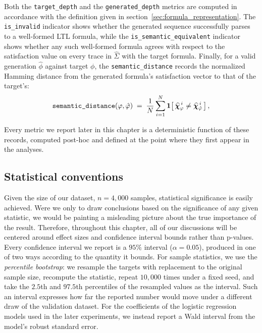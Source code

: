 \documentclass[titlepage,a4paper,11pt]{report}
\begin{document}
    Both the \texttt{target\_depth} and the \texttt{generated\_depth} metrics are computed in accordance with the definition given in section~\ref{sec:formula_representation}. The \texttt{is\_invalid} indicator shows whether the generated sequence successfully parses to a well-formed LTL formula, while the \texttt{is\_semantic\_equivalent} indicator shows whether any such well-formed formula agrees with respect to the satisfaction value on every trace in $\widehat{\Sigma}$ with the target formula. Finally, for a valid generation $\hat\phi$ against target $\phi$, the \texttt{semantic\_distance} records the normalized Hamming distance from the generated formula's satisfaction vector to that of the target's:
    \begin{equation}
        \texttt{semantic\_distance}(\varphi, \hat{\varphi}) \;=\; \frac{1}{N}\sum_{i=1}^{N} \mathbf{1}\!\left[\,\bm{\widehat\chi}_{\varphi}^{\,i} \neq \bm{\widehat\chi}_{\hat{\varphi}}^{\,i}\,\right],
        \label{eq:semantic_distance}
    \end{equation}

    Every metric we report later in this chapter is a deterministic function of these records, computed post-hoc and defined at the point where they first appear in the analyses.

    
    \subsection{Statistical conventions}\label{sec:stats_framework}
    Given the size of our dataset, $n = 4{,}000$ samples, statistical significance is easily achieved. Were we only to draw conclusions based on the significance of any given statistic, we would be painting a misleading picture about the true importance of the result. Therefore, throughout this chapter, all of our discussions will be centered around effect sizes and confidence interval bounds rather than p-values. Every confidence interval we report is a $95\%$ interval ($\alpha = 0.05$), produced in one of two ways according to the quantity it bounds. For sample statistics, we use the \emph{percentile bootstrap}: we resample the targets with replacement to the original sample size, recompute the statistic, repeat $10{,}000$ times under a fixed seed, and take the $2.5$th and $97.5$th percentiles of the resampled values as the interval. Such an interval expresses how far the reported number would move under a different draw of the validation dataset. For the coefficients of the logistic regression models used in the later experiments, we instead report a Wald interval from the model's robust standard error.
\end{document}
